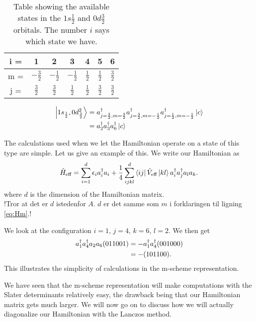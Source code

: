 \begin{table}
\begin{center}
\begin{tabular}{|c|c|c|c|c|c|c|}
	\hline
	i = & 1 & 2 & 3 & 4 & 5 & 6 \\
	\hline
	m = & $-\frac32$ & $-\frac12$ & $-\frac12$ & $\frac12$ & $\frac12$ & $\frac32$ \\
	\hline
	j = & $\frac32$ & $\frac32$ & $\frac12$ & $\frac12$ & $\frac32$ & $\frac32$ \\
	\hline
\end{tabular}
\caption{Table showing the available states in the $1s\frac12$ and $0d\frac32$ orbitals. The number $i$ says which state we have.}
\label{tab:m}
\end{center}
\end{table}

\begin{align}
	\ket{1s_{\frac12},0d_{\frac32}^2} &= a_{j=\frac32,m=\frac32}^\dagger a_{j=\frac32,m=-\frac12}^\dagger a_{j=\frac12,m=-\frac12}^\dagger\ket c\notag\\
	&= a_2^\dagger a_3^\dagger a_6^\dagger\ket c
	\label{eq:SD3}
\end{align}

The calculations used when we let the Hamiltonian operate on a state of this
type are simple. Let us give an example of this. We write our Hamiltonian as
\begin{align}
	\hat{H}_{\textrm{eff}} = \sum_{i=1}^d\epsilon_ia_i^\dagger a_i+\frac14\sum_{ijkl}^d\left\langle ij \right|\hat{V}_{\textrm{eff}}\left| kl \right\rangle a_i^\dagger a_j^\dagger a_la_k.
\end{align}
where $d$ is the dimension of the Hamiltonian matrix.
\\!Tror at det er $d$ istedenfor $A$. $d$ er det samme som $m$ i forklaringen
til ligning \ref{eq:Hm}.!

We look at the configuration $i=1$, $j=4$, $k=6$, $l=2$. We then get
\begin{align}
	a_1^\dagger a_4^\dagger a_2a_6(011001) &= - a_1^\dagger a_4^\dagger(001000)\notag \\
	&=-(101100).
\end{align}
This illustrates the simplicity of calculations in the m-scheme representation.

We have seen that the m-scheme representation will make computations with the
Slater determinants relatively easy, the drawback being that our Hamiltonian
matrix gets much larger. We will now go on to discuss how we will actually
diagonalize our Hamiltonian with the Lanczos method.

